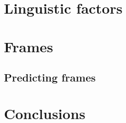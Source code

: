 \section{Linguistic factors}

\section{Frames}

\subsection{Predicting frames}

\section{Conclusions}




